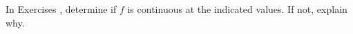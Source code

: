 {\noindent In Exercises}
{, determine if $f$ is continuous at the indicated values. If not, explain why.}
